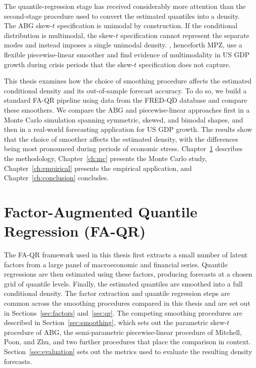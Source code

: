 \documentclass[12pt]{report} %
\begin{document}
The quantile-regression stage has received considerably more attention than the second-stage procedure used to convert the estimated quantiles into a density. The ABG skew-$t$ specification is unimodal by construction. If the conditional distribution is multimodal, the skew-$t$ specification cannot represent the separate modes and instead imposes a single unimodal density. \textcite{mitchell2024constructing}, henceforth MPZ, use a flexible piecewise-linear smoother and find evidence of multimodality in US GDP growth during crisis periods that the skew-$t$ specification does not capture.

This thesis examines how the choice of smoothing procedure affects the estimated conditional density and its out-of-sample forecast accuracy. To do so, we build a standard FA-QR pipeline using data from the FRED-QD database and compare these smoothers. We compare the ABG and piecewise-linear approaches first in a Monte Carlo simulation spanning symmetric, skewed, and bimodal shapes, and then in a real-world forecasting application for US GDP growth. The results show that the choice of smoother affects the estimated density, with the differences being most pronounced during periods of economic stress. Chapter~\ref{ch:faqr} describes the methodology, Chapter~\ref{ch:mc} presents the Monte Carlo study, Chapter~\ref{ch:empirical} presents the empirical application, and Chapter~\ref{ch:conclusion} concludes.


\chapter{Factor-Augmented Quantile Regression (FA-QR)}
\label{ch:faqr}

The FA-QR framework used in this thesis first extracts a small number of latent factors from a large panel of macroeconomic and financial series. Quantile regressions are then estimated using these factors, producing forecasts at a chosen grid of quantile levels. Finally, the estimated quantiles are smoothed into a full conditional density. The factor extraction and quantile regression steps are common across the smoothing procedures compared in this thesis and are set out in Sections~\ref{sec:factors} and~\ref{sec:qr}. The competing smoothing procedures are described in Section~\ref{sec:smoothing}, which sets out the parametric skew-$t$ procedure of ABG, the semi-parametric piecewise-linear procedure of Mitchell, Poon, and Zhu, and two further procedures that place the comparison in context. Section~\ref{sec:evaluation} sets out the metrics used to evaluate the resulting density forecasts.
\end{document}

